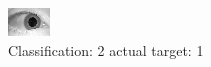 \begin{figure}[h!]
\begin{center}
\includegraphics[width=0.60\columnwidth]{figures/ID1485_class_2_target_1.png}
\end{center}
\caption{ Classification: 2 actual target: 1}
\label{fig:ID1485_class_2_target_1}
\end{figure}
